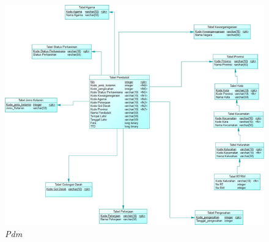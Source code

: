 \documentclass[12pt,a4paper,bahasa]{article}
\begin{document}
\begin{figure}[!htbp]
\centering
\includegraphics[scale=0.8]{gambar/Pdm.png}
\caption{\textit{Pdm}}
\label{Pdm}
\end{figure}
\end{document}
